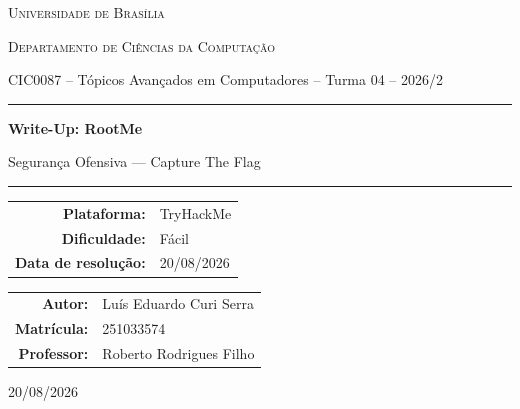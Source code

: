 \documentclass[12pt,a4paper]{article}
\newcommand{\desafioNome}{RootMe}
\newcommand{\plataforma}{TryHackMe}
\newcommand{\dificuldade}{Fácil}
\newcommand{\dataResolucao}{20/08/2026}
\newcommand{\autorNome}{Luís Eduardo Curi Serra}
\newcommand{\materia}{CIC0087 -- Tópicos Avançados em Computadores -- Turma 04 -- 2026/2}
\newcommand{\departamento}{Departamento de Ciências da Computação}
\newcommand{\matricula}{251033574}
\newcommand{\professor}{Roberto Rodrigues Filho}
\newcommand{\universidade}{Universidade de Brasília}
\begin{document}
\begin{titlepage}
  \thispagestyle{empty}
  \centering
  {\scshape \universidade \par}
  {\scshape \departamento \par}
  \vspace{0.4cm}
  {\small \materia \par}
  \vspace{2.5cm}

  \rule{\linewidth}{0.4pt}\par
  \vspace{0.6cm}
  {\huge \bfseries Write-Up: \desafioNome \par}
  \vspace{0.4cm}
  {\large Segurança Ofensiva --- Capture The Flag \par}
  \vspace{0.6cm}
  \rule{\linewidth}{0.4pt}\par

  \vspace{2.0cm}
  \begin{tabular}{rl}
    \textbf{Plataforma:}       & \plataforma       \\[4pt]
    \textbf{Dificuldade:}      & \dificuldade      \\[4pt]
    \textbf{Data de resolução:}& \dataResolucao    \\
  \end{tabular}

  \vfill

  \begin{tabular}{rl}
    \textbf{Autor:}     & \autorNome  \\[4pt]
    \textbf{Matrícula:} & \matricula  \\[4pt]
    \textbf{Professor:} & \professor  \\
  \end{tabular}

  \vspace{1.2cm}
  {\small \dataResolucao \par}
\end{titlepage}

\newpage
\tableofcontents
\thispagestyle{fancy}
\newpage

\end{document}
